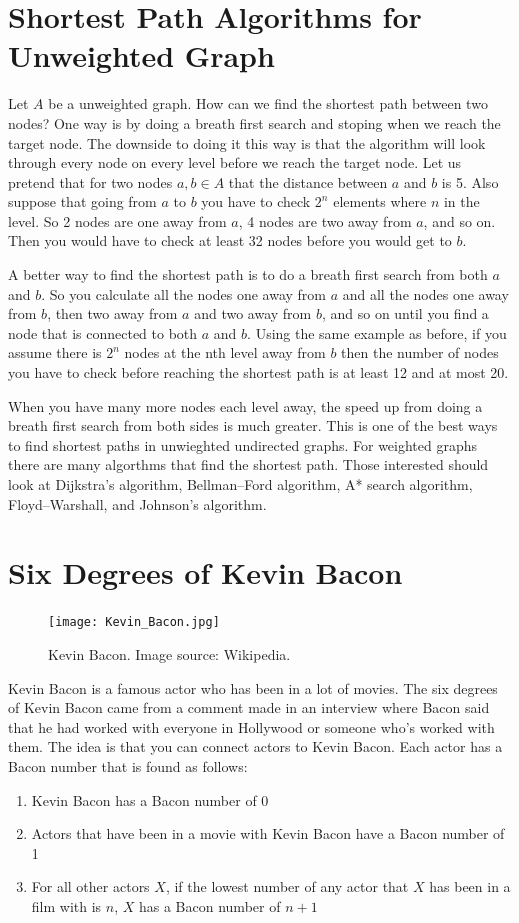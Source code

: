 \section*{Shortest Path Algorithms for Unweighted Graph}
Let $A$ be a unweighted graph. How can we find the shortest path between two nodes?  One way is by doing a breath first search and stoping when we reach the target node. The downside to doing it this way is that the algorithm will look through every node on every level before we reach the target node. Let us pretend that for two nodes $a, b \in A$ that the distance between $a$ and $b$ is 5. Also suppose that going from $a$ to $b$ you have to check $2^n$ elements where $n$ in the level. So 2 nodes are one away from $a$, 4 nodes are two away from $a$, and so on. Then you would have to check at least 32 nodes before you would get to $b$.

A better way to find the shortest path is to do a breath first search from both $a$ and $b$. So you calculate all the nodes one away from $a$ and all the nodes one away from $b$, then two away from $a$ and two away from $b$, and so on until you find a node that is connected to both $a$ and $b$. Using the same example as before, if you assume there is $2^n$ nodes at the nth level away from $b$ then the number of nodes you have to check before reaching the shortest path is at least 12 and at most 20.

When you have many more nodes each level away, the speed up from doing a breath first search from both sides is much greater. This is one of the best ways to find shortest paths in unwieghted undirected graphs. For weighted graphs there are many algorthms that find the shortest path. Those interested should look at Dijkstra's algorithm, Bellman–Ford algorithm, A* search algorithm, Floyd–Warshall, and Johnson's algorithm.

\section*{Six Degrees of Kevin Bacon}
\begin{figure}[h]
\texttt{[image: Kevin\_Bacon.jpg]}
\caption{Kevin Bacon.  Image source: Wikipedia.}
\end{figure}

Kevin Bacon is a famous actor who has been in a lot of movies. The six degrees of Kevin Bacon came from a comment made in an interview where Bacon said that he had worked with everyone in Hollywood or someone who's worked with them.  The idea is that you can connect actors to Kevin Bacon. Each actor has a Bacon number that is found as follows:
\begin{enumerate}
\item Kevin Bacon has a Bacon number of 0
\item Actors that have been in a movie with Kevin Bacon have a Bacon number of 1
\item For all other actors $X$, if the lowest number of any actor that $X$ has been in a film with is $n$, $X$ has a Bacon number of $n+1$
\end{enumerate}

